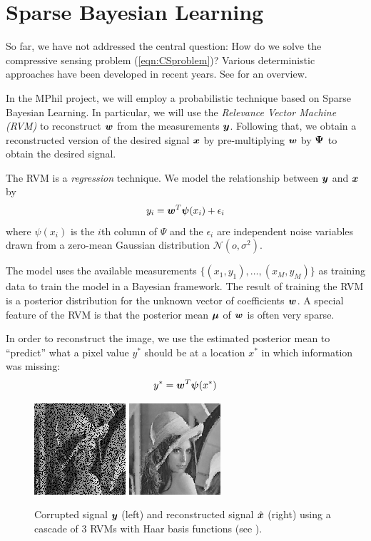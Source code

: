 \chapter{Sparse Bayesian Learning}
So far, we have not addressed the central question: How do we solve the compressive sensing problem (\ref{eqn:CSproblem})?
Various deterministic approaches have been developed in recent years.
See \cite{pilikos2014} for an overview.

In the MPhil project, we will employ a probabilistic technique based on Sparse Bayesian Learning.
In particular, we will use the \emph{Relevance Vector Machine (RVM)} \cite{tipping2001,tipping2003} to reconstruct $\boldsymbol w$ from the measurements $\boldsymbol y$.
Following that, we obtain a reconstructed version of the desired signal $\boldsymbol x$ by pre-multiplying $\boldsymbol w$ by $\boldsymbol \Psi$ to obtain the desired signal.

The RVM is a \emph{regression} technique.
We model the relationship between $\boldsymbol y$ and $\boldsymbol x$ by
\begin{equation}
\label{eqn:rvmmodel}
y_i = \boldsymbol w^T \boldsymbol \psi(x_i) + \epsilon_i
\end{equation}
where $\psi(x_i)$ is the $i$th column of $\Psi$ and the $\epsilon_i$ are independent noise variables drawn from a zero-mean Gaussian distribution $\mathcal{N}(o,\sigma^2)$.

The model uses the available measurements $\{(x_1,y_1),\dots,(x_M,y_M)\}$ as training data to train the model in a Bayesian framework.
The result of training the RVM is a posterior distribution for the unknown vector of coefficients $\boldsymbol w$.
A special feature of the RVM is that the posterior mean $\boldsymbol \mu$ of $\boldsymbol w$ is often very sparse.

In order to reconstruct the image, we use the estimated posterior mean to ``predict'' what a pixel value $y^*$ should be at a location $x^*$ in which information was missing:
\begin{equation}
y^* = \boldsymbol w^T\boldsymbol\psi(x^*)
\end{equation}

\begin{figure}
\label{fig:lennareconstruction}
\center
\includegraphics{0.png}
\includegraphics{3.png}
\caption{Corrupted signal $\boldsymbol y$ (left) and reconstructed signal $\hat{\boldsymbol x}$ (right) using a cascade of 3 RVMs with Haar basis functions (see \cite{pilikos2014}).}
\end{figure}

